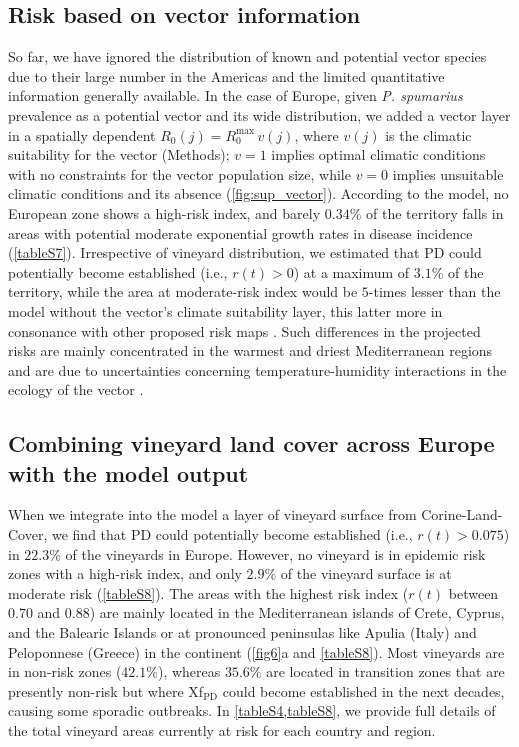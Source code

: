     \subsection{Risk based on vector information}

    So far, we have ignored the distribution of known and potential vector
    species due to their large number in the Americas and the limited
    quantitative information generally available. In the case of Europe, given
    \textit{P. spumarius} prevalence as a potential
    vector and its wide distribution, we added	a vector layer in a spatially
    dependent $R_0(j) = R_0^{\textrm{max}}\, v(j)$, where $v(j)$ is the
    climatic suitability for the vector (Methods); $v=1$ implies optimal
    climatic conditions with no constraints for the vector population size,
    while $v=0$ implies unsuitable climatic conditions and its absence
    (\cref{fig:sup_vector}). According to the model, no European zone shows a
    high-risk index, and barely $0.34\%$ of the territory falls in areas with
    potential moderate exponential growth rates in disease incidence
    (\cref{tableS7}). Irrespective of vineyard distribution, we estimated that
    PD could potentially become established (i.e., $r(t) > 0$) at a maximum of
$3.1\%$ of the territory, while the area at moderate-risk index would be
$5$-times lesser than the model without the vector's climate suitability layer,
    this latter more in consonance with other proposed risk maps
    \cite{Godefroid2019,Bragard2019}. Such differences in the projected risks
    are mainly concentrated in the warmest and driest Mediterranean regions and
    are due to uncertainties concerning temperature-humidity interactions in
    the ecology of the vector \cite{Godefroid2021}.

    \subsection{Combining vineyard land cover across Europe with the model
        output}
    When we integrate into the model a layer of vineyard surface from
    Corine-Land-Cover, we find that PD could potentially become established
    (i.e.,
$r(t)>0.075$) in $22.3\%$ of the vineyards in Europe. However, no vineyard is
    in epidemic risk zones with a high-risk index, and only $2.9\%$ of the
    vineyard surface is at moderate risk (\cref{tableS8}). The areas with the
    highest risk index ($r(t)$ between $0.70$ and $0.88$) are mainly located in
    the Mediterranean islands of Crete, Cyprus, and the Balearic Islands or at
    pronounced peninsulas like Apulia (Italy) and Peloponnese (Greece) in the
    continent (\cref{fig6}a and \cref{tableS8}). Most vineyards are in
    non-risk zones ($42.1\%$), whereas $35.6\%$ are located in transition zones
    that are presently non-risk but where Xf$_{\textrm{PD}}$ could become
    established in the next decades, causing some sporadic outbreaks. In
    \cref{tableS4,tableS8}, we provide full details of the total vineyard
    areas currently at risk for each country and region.


